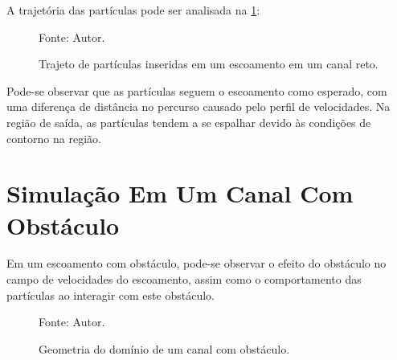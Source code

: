 A trajetória das partículas pode ser analisada na \ref{channel_trajectory}:
\begin{figure}[H]
    \centering
     {\raggedleft \scriptsize Fonte: Autor.}
    \caption{Trajeto de partículas inseridas em um escoamento em um canal reto.}
    \label{channel_trajectory}
\end{figure}

Pode-se observar que as partículas seguem o escoamento como esperado, com uma diferença de distância no percurso causado pelo perfil de velocidades.
Na região de saída, as partículas tendem a se espalhar devido às condições de contorno na região.

\section{\textbf{Simulação Em Um Canal Com Obstáculo}}
\label{sec_obstacle}
Em um escoamento com obstáculo, pode-se observar o efeito do obstáculo no campo de velocidades do escoamento, assim como o comportamento das partículas ao interagir com este obstáculo.

\begin{figure}[H]
    \centering
     {\raggedleft \scriptsize Fonte: Autor.}
    \caption{Geometria do domínio de um canal com obstáculo.}
    \label{obstacle_geometry}
\end{figure}

